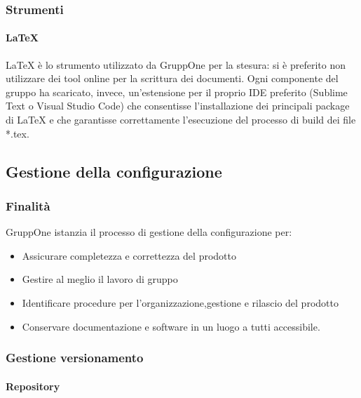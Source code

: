 \documentclass[../norme-di-progetto.tex]{subfiles}
\begin{document}
\subsubsection{Strumenti}

\paragraph{\LaTeX}%
\label{par:LaTeX}
\LaTeX{} è lo strumento utilizzato da GruppOne per la stesura: si è preferito non utilizzare dei tool online per la scrittura dei documenti.
Ogni componente del gruppo ha scaricato, invece, un'estensione per il proprio IDE preferito (Sublime Text o Visual Studio Code) che consentisse l'installazione dei principali package di \LaTeX{} e che garantisse correttamente l'esecuzione del processo di build dei file *.tex.

\subsection{Gestione della configurazione}%
\label{sub:gestione_della_configurazione}

\subsubsection{Finalità}%
\label{subs:gestione_della_configurazione/finalita}

GruppOne istanzia il processo di gestione della configurazione per:
\begin{itemize}
  \item Assicurare completezza e correttezza del prodotto
  \item Gestire al meglio il lavoro di gruppo
  \item Identificare procedure per l'organizzazione,gestione e rilascio del prodotto
  \item Conservare documentazione e software in un luogo a tutti accessibile.
\end{itemize}

\subsubsection{Gestione versionamento}%
\label{subs:gestione_versionamento}

\paragraph{Repository}%
\label{par:repository}
\end{document}

